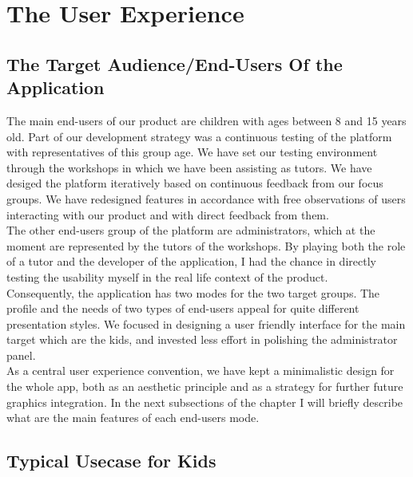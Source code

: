 
\chapter{The User Experience}


\section{The Target Audience/End-Users Of the Application}

The main end-users of our product are children with ages between 8 and 15 years old. Part of our development strategy was a continuous testing of the platform with representatives of this group age. We have set our testing environment through the workshops in which we have been assisting as tutors. 
We have desiged the platform iteratively based on continuous feedback from our focus groups. We have redesigned features in accordance with free observations of users interacting with our product and with direct feedback from them. \\

The other end-users group of the platform are administrators, which at the moment are represented by the tutors of the workshops. By playing both the role of a tutor and the developer of the application, I had the chance in directly testing the usability myself in the real life context of the product.\\

Consequently, the application has two modes for the two target groups. The profile and the needs of two types of end-users appeal for quite different presentation styles. We focused in designing a user friendly interface for the main target which are the kids, and invested less effort in polishing the administrator panel.	\\

As a central user experience convention, we have kept a minimalistic design for the whole app, both as an aesthetic principle and as a strategy for further future graphics integration.	
In the next subsections of the chapter I will briefly describe what are the main features of each end-users mode.


\section{Typical Usecase for Kids}

